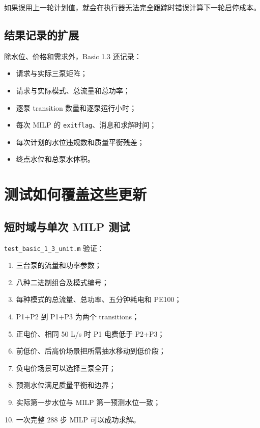 \documentclass[UTF8,a4paper,11pt]{ctexart}
\newcommand{\code}[1]{\texttt{#1}}
\begin{document}
如果误用上一轮计划值，就会在执行器无法完全跟踪时错误计算下一轮启停成本。

\subsection{结果记录的扩展}

除水位、价格和需求外，Basic 1.3 还记录：

\begin{itemize}
  \item 请求与实际三泵矩阵；
  \item 请求与实际模式、总流量和总功率；
  \item 逐泵 transition 数量和逐泵运行小时；
  \item 每次 MILP 的 \code{exitflag}、消息和求解时间；
  \item 每次计划的水位违规数和质量平衡残差；
  \item 终点水位和总泵水体积。
\end{itemize}

\section{测试如何覆盖这些更新}

\subsection{短时域与单次 MILP 测试}

\code{test\_basic\_1\_3\_unit.m} 验证：

\begin{enumerate}
  \item 三台泵的流量和功率参数；
  \item 八种二进制组合及模式编号；
  \item 每种模式的总流量、总功率、五分钟耗电和 PE100；
  \item P1+P2 到 P1+P3 为两个 transitions；
  \item 正电价、相同 50 L/s 时 P1 电费低于 P2+P3；
  \item 前低价、后高价场景把所需抽水移动到低价段；
  \item 负电价场景可以选择三泵全开；
  \item 预测水位满足质量平衡和边界；
  \item 实际第一步水位与 MILP 第一预测水位一致；
  \item 一次完整 288 步 MILP 可以成功求解。
\end{enumerate}
\end{document}
